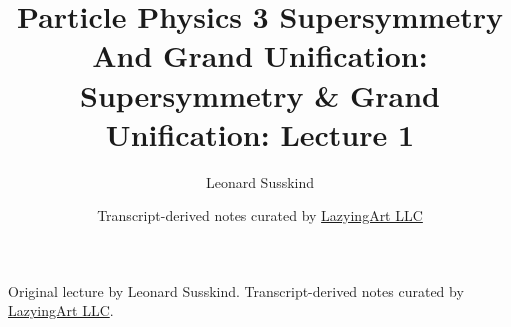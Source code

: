 \documentclass[11pt,oneside]{book}
\begin{document}
\frontmatter
\title{Particle Physics 3 Supersymmetry And Grand Unification: Supersymmetry \& Grand Unification: Lecture 1}
\author{Leonard Susskind}
\date{Transcript-derived notes curated by \href{https://lazying.art}{LazyingArt LLC}}
\maketitle
\begin{center}
\small Original lecture by Leonard Susskind. Transcript-derived notes curated by \href{https://lazying.art}{LazyingArt LLC}.
\end{center}
\clearpage
\mainmatter

\end{document}
